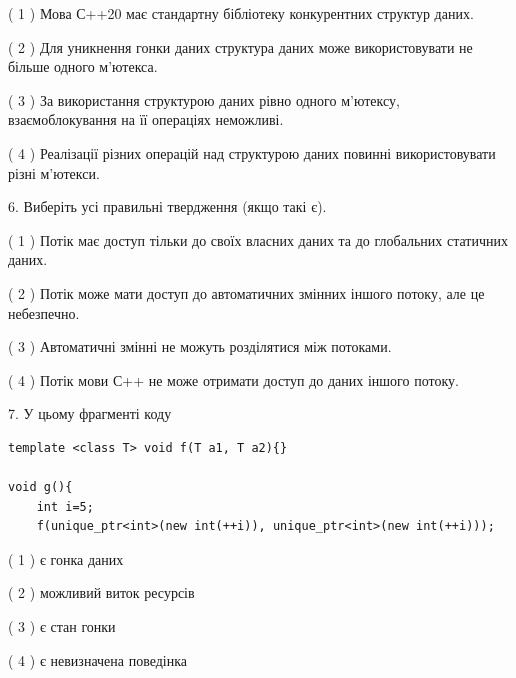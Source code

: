 \documentclass[12pt, ukrainian]{article}
\begin{document}
\begin {large}
{( 1 ) Мова С++20 має стандартну бібліотеку конкурентних структур даних.%

( 2 ) Для уникнення гонки даних структура даних може використовувати не більше одного м’ютекса.%

( 3 ) За використання структурою даних рівно одного м’ютексу, взаємоблокування на її операціях неможливі.%

( 4 ) Реалізації різних операцій над структурою даних повинні використовувати різні м’ютекси.%
\newpage



\vspace{5mm}
6. Виберіть усі правильні твердження (якщо такі є).\par
\vspace{2mm}

( 1 ) Потік має доступ тільки до своїх власних даних та до глобальних статичних даних.%

( 2 ) Потік може мати доступ до автоматичних змінних іншого потоку, але це небезпечно.%

( 3 ) Автоматичні змінні не можуть розділятися між потоками.%

( 4 ) Потік мови С++ не може отримати доступ до даних іншого потоку.%


\vspace{5mm}
7. У цьому фрагменті коду
\begin{verbatim}
template <class T> void f(T a1, T a2){}

void g(){
    int i=5;
    f(unique_ptr<int>(new int(++i)), unique_ptr<int>(new int(++i)));
\end{verbatim}

( 1 ) є гонка даних%

( 2 ) можливий виток ресурсів%

( 3 ) є стан гонки%

( 4 ) є невизначена поведінка%
}
\end {large}
\end{document}
